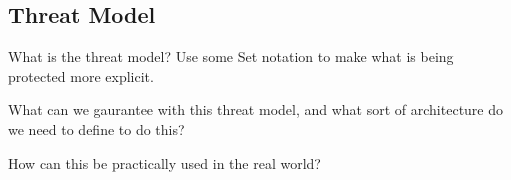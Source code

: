 
\subsection{Threat Model}
What is the threat model?
Use some Set notation to make what is being protected more explicit.

What can we gaurantee with this threat model, and what sort of architecture
do we need to define to do this?

How can this be practically used in the real world?

